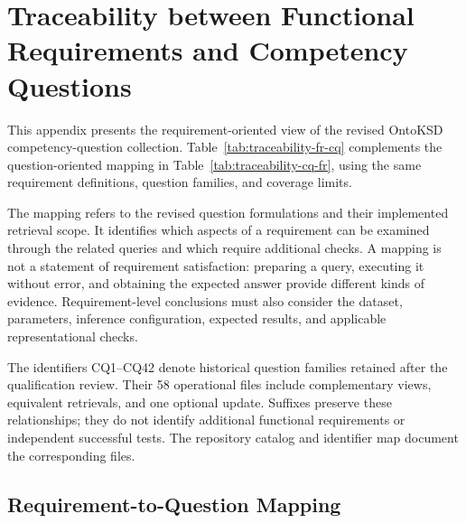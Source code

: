 \chapter{Traceability between Functional Requirements and Competency Questions}
\label{ap:OntoKSD-FR-CQ}

This appendix presents the requirement-oriented view of the revised
OntoKSD competency-question collection. Table~\ref{tab:traceability-fr-cq}
complements the question-oriented mapping in
Table~\ref{tab:traceability-cq-fr}, using the same requirement definitions,
question families, and coverage limits.

The mapping refers to the revised question formulations and their
implemented retrieval scope. It identifies which aspects of a requirement
can be examined through the related queries and which require additional
checks. A mapping is not a statement of requirement satisfaction:
preparing a query, executing it without error, and obtaining the expected
answer provide different kinds of evidence. Requirement-level conclusions
must also consider the dataset, parameters, inference configuration,
expected results, and applicable representational checks.

The identifiers CQ1--CQ42 denote historical question families retained
after the qualification review. Their 58 operational files include
complementary views, equivalent retrievals, and one optional update.
Suffixes preserve these relationships; they do not identify additional
functional requirements or independent successful tests. The repository
catalog and identifier map document the corresponding files.

\section{Requirement-to-Question Mapping}


